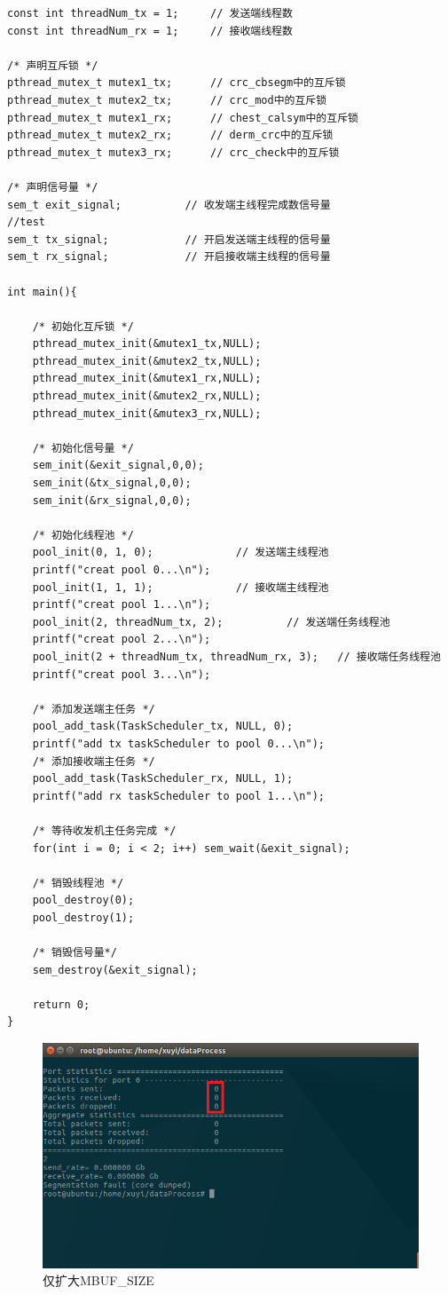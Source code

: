 \documentclass{article}
\begin{document}
\begin{lstlisting}
const int threadNum_tx = 1;		// 发送端线程数
const int threadNum_rx = 1;		// 接收端线程数

/* 声明互斥锁 */
pthread_mutex_t mutex1_tx;		// crc_cbsegm中的互斥锁
pthread_mutex_t mutex2_tx;		// crc_mod中的互斥锁
pthread_mutex_t mutex1_rx;		// chest_calsym中的互斥锁
pthread_mutex_t mutex2_rx;		// derm_crc中的互斥锁
pthread_mutex_t mutex3_rx;		// crc_check中的互斥锁

/* 声明信号量 */
sem_t exit_signal;			// 收发端主线程完成数信号量
//test
sem_t tx_signal;			// 开启发送端主线程的信号量
sem_t rx_signal;			// 开启接收端主线程的信号量

int main(){
	
	/* 初始化互斥锁 */
	pthread_mutex_init(&mutex1_tx,NULL);
	pthread_mutex_init(&mutex2_tx,NULL);
	pthread_mutex_init(&mutex1_rx,NULL);
	pthread_mutex_init(&mutex2_rx,NULL);
	pthread_mutex_init(&mutex3_rx,NULL);
	
	/* 初始化信号量 */
	sem_init(&exit_signal,0,0);
	sem_init(&tx_signal,0,0);
	sem_init(&rx_signal,0,0);
	
	/* 初始化线程池 */
	pool_init(0, 1, 0);				// 发送端主线程池
	printf("creat pool 0...\n");
	pool_init(1, 1, 1);				// 接收端主线程池
	printf("creat pool 1...\n");
	pool_init(2, threadNum_tx, 2);			// 发送端任务线程池
	printf("creat pool 2...\n");
	pool_init(2 + threadNum_tx, threadNum_rx, 3);	// 接收端任务线程池
	printf("creat pool 3...\n");
	
	/* 添加发送端主任务 */
	pool_add_task(TaskScheduler_tx, NULL, 0);
	printf("add tx taskScheduler to pool 0...\n");
	/* 添加接收端主任务 */
	pool_add_task(TaskScheduler_rx, NULL, 1);
	printf("add rx taskScheduler to pool 1...\n");

	/* 等待收发机主任务完成 */
	for(int i = 0; i < 2; i++) sem_wait(&exit_signal);

	/* 销毁线程池 */
	pool_destroy(0);
	pool_destroy(1);

	/* 销毁信号量*/
	sem_destroy(&exit_signal);

	return 0;
}
\end{lstlisting}
\begin{figure}[H]
	\centering
	\includegraphics[width = .8\textwidth]{fault_dumped.png}
	\caption{仅扩大MBUF\_SIZE}
\end{figure}
\end{document}
